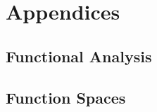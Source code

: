 \documentclass[../main.tex]{subfiles}
\begin{document}
\appendix
\chapter{Appendices}

\section{Functional Analysis}

\section{Function Spaces}
\end{document}
